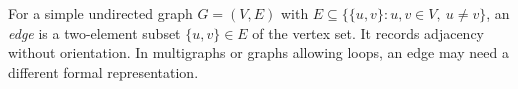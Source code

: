 
For a simple undirected graph $G=(V,E)$ with $E\subseteq\{\{u,v\}:u,v\in V,\ u\ne v\}$, an \emph{edge} is a two-element subset $\{u,v\}\in E$ of the vertex set. It records adjacency without orientation. In multigraphs or graphs allowing loops, an edge may need a different formal representation.
